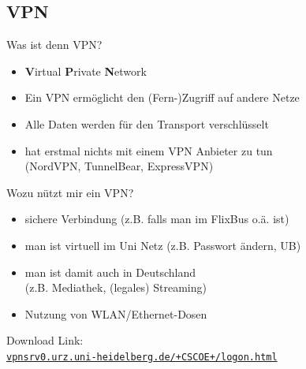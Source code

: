 
\subsection{VPN}
\begin{frame}{Was ist denn VPN?}
    \large
    \begin{itemize}
        \item \textbf{V}irtual \textbf{P}rivate \textbf{N}etwork
        \item Ein VPN ermöglicht den (Fern-)Zugriff auf andere Netze
        \item Alle Daten werden für den Transport verschlüsselt
        \item hat erstmal nichts mit einem VPN Anbieter zu tun \\
              (NordVPN, TunnelBear, ExpressVPN)
    \end{itemize}
\end{frame}

\begin{frame}{Wozu nützt mir ein VPN?}
    \large
    \begin{itemize}
        \item sichere Verbindung (z.B. falls man im FlixBus o.ä. ist)
        \item man ist \glqq{}virtuell\grqq{} im Uni Netz (z.B. Passwort ändern, UB)
        \item man ist damit auch in Deutschland \\
            (z.B. Mediathek, (legales) Streaming)
        \item Nutzung von WLAN/Ethernet-Dosen
    \end{itemize}
    Download Link: \\
    {\normalsize \href{https://vpnsrv0.urz.uni-heidelberg.de/+CSCOE+/logon.html}{\texttt{vpnsrv0.urz.uni-heidelberg.de/+CSCOE+/logon.html}}}
\end{frame}

